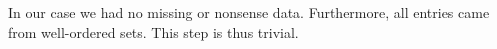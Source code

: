 In our case we had no missing or nonsense data. Furthermore, all entries came from well-ordered sets. This step is thus trivial.